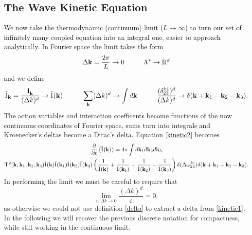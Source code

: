 \subsection{The Wave Kinetic Equation}

We now take the thermodynamic (continuum) limit ($L \rightarrow \infty$) to turn our set of infinitely many coupled equation into an integral one, easier to approach analytically.
In Fourier space the limit takes the form 
\begin{equation}
    \Delta\mathbf{ k} = \frac{2\pi}{L} \rightarrow 0 \hspace{10mm} \Lambda^* \rightarrow \mathbb{R}^d
\end{equation}
and we define 
\begin{equation}
    \tilde{\Ia}_\mathbf{k}=\frac{\Ia_\mathbf{k}}{(\Delta k)^d} \rightarrow \tilde{\Ia}(\mathbf{k}) \hspace{10mm} \sum_\mathbf{k} (\Delta k)^d \rightarrow \int d\mathbf{k} \hspace{10mm} 
    \frac{(\delta^{k1}_{23})^d}{(\Delta k)^d} \rightarrow \delta(\mathbf{k} + \mathbf{k}_1 - \mathbf{k}_2 - \mathbf{k}_3).
\end{equation}
The action variables and interaction coefficents become functions of the now continuous coordinates of Fourier space, sums turn into integrals and Kroenecker's deltas become a
Dirac's delta. Equation \eqref{kinetic2} becomes
\begin{multline}
    \frac{\partial}{\partial t} \left\langle \tilde{\mathrm{I}^{}}(\mathbf{k})\right\rangle = 4 \pi\int d\mathbf{k}_1 d\mathbf{k}_2 d\mathbf{k}_3 \\
    \mathrm{T}^2(\mathbf{k}, \mathbf{k}_1, \mathbf{k}_2, \mathbf{k}_3)\bar{\mathrm{I}^{}}(\mathbf{k})\bar{\mathrm{I}^{}}(\mathbf{k}_1)\bar{\mathrm{I}^{}}(\mathbf{k}_2)\bar{\mathrm{I}^{}}(\mathbf{k}_3)
    \left(\frac{1}{\bar{\mathrm{I}^{}}(\mathbf{k})} + \frac{1}{\bar{\mathrm{I}^{}}(\mathbf{k}_1)} - \frac{1}{\bar{\mathrm{I}^{}}(\mathbf{k}_2)}- \frac{1}{\bar{\mathrm{I}^{}}(\mathbf{k}_3)}  \right)
    \delta(\Delta{\omega}^{k1}_{23})\delta(\mathbf{k} + \mathbf{k}_1 - \mathbf{k}_2 - \mathbf{k}_3).
    \label{kinetic3}
\end{multline}
In performing the limit we must be careful to require that 
\begin{equation}
\underset{\varepsilon, \Delta k \rightarrow 0}{\lim} \frac{(\Delta k)^d}{\varepsilon} = 0 ,
\end{equation}
as otherwise we could not use definition \eqref{delta} to extract a delta from \eqref{kinetic1}. \\
In the following we will recover the previous discrete notation for compactness, while still working in the continuous limit.\\

